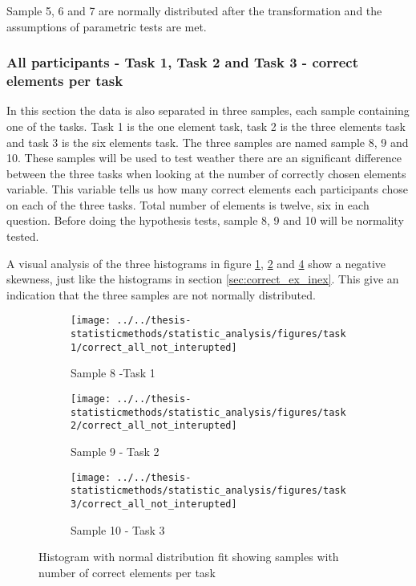  Sample 5, 6 and 7 are normally distributed after the transformation and the assumptions of parametric tests are met. 
 
 \subsubsection[Sample 8, 9 and 10]{All participants - Task 1, Task 2 and Task 3 - correct elements per task}\label{sec:task123_correct}
 In this section the data is also separated in three samples, each sample containing one of the tasks. Task 1 is the one element task, task 2 is the three elements task and task 3 is the six elements task. The three samples are named sample 8, 9 and 10. These samples will be used to test weather there are an significant difference between the three tasks when looking at the number of correctly chosen elements variable. This variable tells us how many correct elements each participants chose on each of the three tasks. Total number of elements is twelve, six in each question. Before doing the hypothesis tests, sample 8, 9 and 10 will be normality tested. 
 
 A visual analysis of the three histograms in figure \ref{fig:correctallnotinterupted_task1}, \ref{fig:correctallnotinterupted_task2} and \ref{fig:correctallnotinterupted_task3} show a negative skewness, just like the histograms in section \ref{sec:correct_ex_inex}. This give an indication that the three samples are not normally distributed. 
 
 \begin{figure}[H]
 	\centering
	 \begin{subfigure}[b]{0.3\textwidth}
	 	\centering
	 	\texttt{[image: ../../thesis-statisticmethods/statistic\_analysis/figures/task1/correct\_all\_not\_interupted]}
	 	\caption{Sample 8 -Task 1}
	 	\label{fig:correctallnotinterupted_task1}
	 \end{subfigure}
	\begin{subfigure}[b]{0.3\textwidth}
		\centering
		\texttt{[image: ../../thesis-statisticmethods/statistic\_analysis/figures/task2/correct\_all\_not\_interupted]}
		\caption{Sample 9 - Task 2}
		\label{fig:correctallnotinterupted_task2}
	\end{subfigure}
	 \begin{subfigure}[b]{0.3\textwidth}
	 	\centering
	 	\texttt{[image: ../../thesis-statisticmethods/statistic\_analysis/figures/task3/correct\_all\_not\_interupted]}
	 	\caption{Sample 10 - Task 3}
	 	\label{fig:correctallnotinterupted_task3}
	 \end{subfigure}
 \caption{Histogram with normal distribution fit showing samples with number of correct elements per task}
 \end{figure}
 
